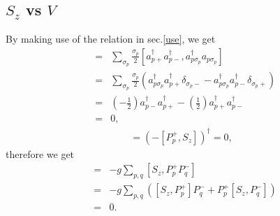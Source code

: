 \documentclass{article}
\begin{document}
\subsection{$S_z$ vs $V$}
By making use of the relation in sec.\ref{use}, we get
\begin{eqnarray*}
[P_p^{+},S_z] &=& \sum_{\sigma_p} \frac{\sigma_p}{2} [a_{p+}^{\dagger} a_{p-}^{\dagger} , a_{p\sigma_p}^{\dagger} a_{p\sigma_p} ] \\
&=& \sum_{\sigma_p} \frac{\sigma_p}{2} \left( a_{p \sigma_p}^{\dagger} a_{p+}^{\dagger} \delta_{\sigma_p-} -  a_{p \sigma_p}^{\dagger} a_{p-}^{\dagger} \delta_{\sigma_p+} \right) \\
&=& \left( -\frac{1}{2}\right) a_{p -}^{\dagger} a_{p+}^{\dagger} - \left( \frac{1}{2} \right) a_{p+}^{\dagger} a_{p-}^{\dagger} \\
&=& 0,
\end{eqnarray*}
\begin{eqnarray*}
[P_p^{-},S_z] = \left( - [P_p^{+},S_z] \right)^{\dagger} = 0,
\end{eqnarray*}
therefore we get
\begin{eqnarray*}
[S_z,V] &=& -g \sum_{p,q} [S_z, P_p^{+}P_q^{-}] \\
&=& -g \sum_{p,q} \left( [S_z, P_p^{+}]P_q^{-} + P_p^{+}[S_z, P_q^{-}] \right) \\
&=& 0.
\end{eqnarray*}
\end{document}
